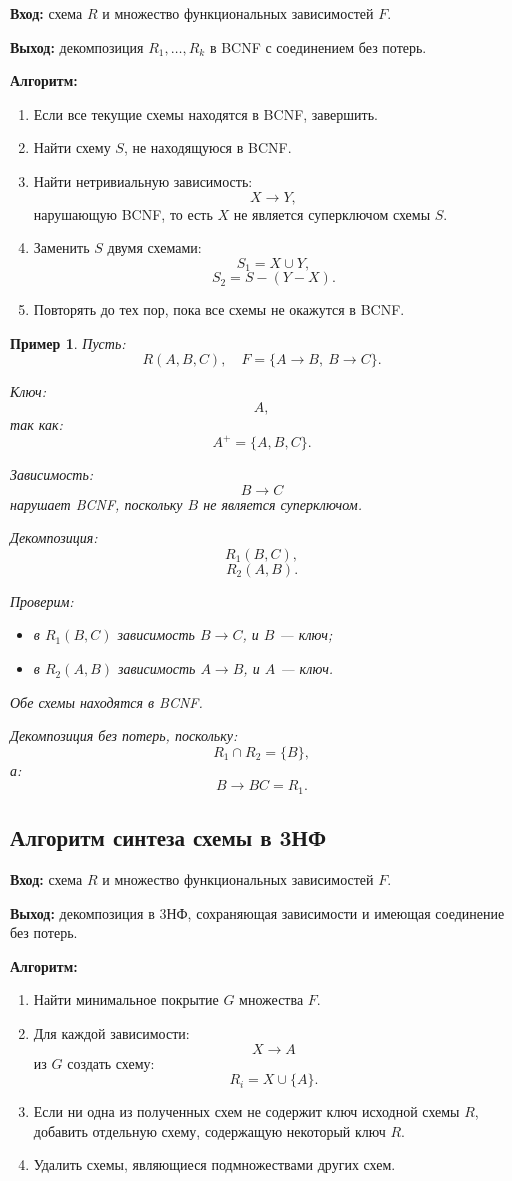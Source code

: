 \documentclass[12pt,a4paper]{article}
\newtheorem{example}{Пример}[section]
\theoremstyle{remark}
\begin{document}
\textbf{Вход:}
схема $R$ и множество функциональных зависимостей $F$.

\textbf{Выход:}
декомпозиция $R_1,\dots,R_k$ в BCNF с соединением без потерь.

\textbf{Алгоритм:}
\begin{enumerate}
    \item Если все текущие схемы находятся в BCNF, завершить.
    \item Найти схему $S$, не находящуюся в BCNF.
    \item Найти нетривиальную зависимость:
    \[
    X \to Y,
    \]
    нарушающую BCNF, то есть $X$ не является суперключом схемы $S$.
    \item Заменить $S$ двумя схемами:
    \[
    S_1 = X \cup Y,
    \]
    \[
    S_2 = S - (Y - X).
    \]
    \item Повторять до тех пор, пока все схемы не окажутся в BCNF.
\end{enumerate}

\begin{example}
Пусть:
\[
R(A,B,C),
\quad F=\{A \to B,\ B \to C\}.
\]

Ключ:
\[
A,
\]
так как:
\[
A^+ = \{A,B,C\}.
\]

Зависимость:
\[
B \to C
\]
нарушает BCNF, поскольку $B$ не является суперключом.

Декомпозиция:
\[
R_1(B,C),
\]
\[
R_2(A,B).
\]

Проверим:
\begin{itemize}
    \item в $R_1(B,C)$ зависимость $B \to C$, и $B$ --- ключ;
    \item в $R_2(A,B)$ зависимость $A \to B$, и $A$ --- ключ.
\end{itemize}

Обе схемы находятся в BCNF.

Декомпозиция без потерь, поскольку:
\[
R_1 \cap R_2 = \{B\},
\]
а:
\[
B \to BC = R_1.
\]
\end{example}

\subsection{Алгоритм синтеза схемы в 3НФ}

\textbf{Вход:}
схема $R$ и множество функциональных зависимостей $F$.

\textbf{Выход:}
декомпозиция в 3НФ, сохраняющая зависимости и имеющая соединение без потерь.

\textbf{Алгоритм:}
\begin{enumerate}
    \item Найти минимальное покрытие $G$ множества $F$.
    \item Для каждой зависимости:
    \[
    X \to A
    \]
    из $G$ создать схему:
    \[
    R_i = X \cup \{A\}.
    \]
    \item Если ни одна из полученных схем не содержит ключ исходной схемы $R$, добавить отдельную схему, содержащую некоторый ключ $R$.
    \item Удалить схемы, являющиеся подмножествами других схем.
\end{enumerate}
\end{document}
